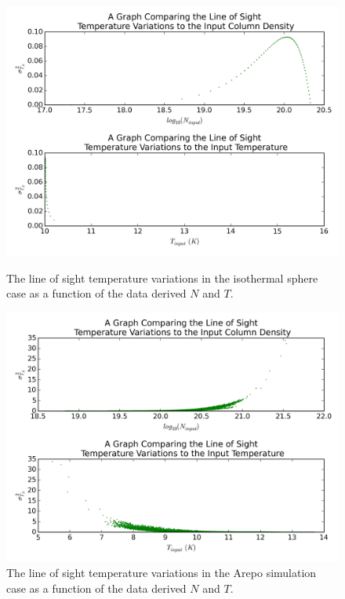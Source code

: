 \documentclass{report}
\begin{document}
\begin{figure}[H]
  \includegraphics[width=\linewidth]{../img/sim/sigma_T_inp.png}
  \caption{The line of sight temperature variations in the isothermal sphere case as a function of the data derived $N$ and $T$.}\label{fig:iso_los}
\endminipage\hfill
{}
  \includegraphics[width=\linewidth]{../img/sph/sigma_T_inp.png}
  \caption{The line of sight temperature variations in the Arepo simulation case as a function of the data derived $N$ and $T$.}\label{fig:sph_los}
\endminipage
\end{figure}
\end{document}
